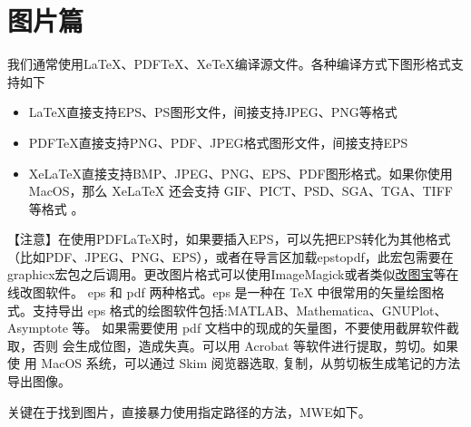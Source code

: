 %
%
%
%

\section{图片篇}



我们通常使用LaTeX、PDFTeX、XeTeX编译源文件。各种编译方式下图形格式支持如下
\begin{itemize}
    \item LaTeX直接支持EPS、PS图形文件，间接支持JPEG、PNG等格式
    \item PDFTeX直接支持PNG、PDF、JPEG格式图形文件，间接支持EPS
    \item XeLaTeX直接支持BMP、JPEG、PNG、EPS、PDF图形格式。如果你使用MacOS，那么
    XeLaTeX 还会支持 GIF、PICT、PSD、SGA、TGA、TIFF 等格式 。
\end{itemize}

【注意】在使用PDFLaTeX时，如果要插入EPS，可以先把EPS转化为其他格式（比如PDF、JPEG、PNG、EPS），或者在导言区加载epstopdf，此宏包需要在graphicx宏包之后调用。更改图片格式可以使用ImageMagick或者类似\href{http://www.gaitubao.com}{改图宝}等在线改图软件。
eps 和 pdf 两种格式。eps 是一种在 TeX 中很常用的矢量绘图格式。支持导出
eps 格式的绘图软件包括:MATLAB、Mathematica、GNUPlot、 Asymptote 等。
如果需要使用 pdf 文档中的现成的矢量图，不要使用截屏软件截取，否则
会生成位图，造成失真。可以用 Acrobat 等软件进行提取，剪切。如果使 用
MacOS 系统，可以通过 Skim 阅览器选取,
复制，从剪切板生成笔记的方法导出图像。


关键在于找到图片，直接暴力使用指定路径的方法，MWE如下。

